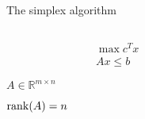 \pagestyle{empty}



\begin{frame}{The simplex algorithm}

  \begin{columns}
    \begin{column}{.5\textwidth}
      \begin{displaymath}
        \begin{array}{c}
          \max c^T x\\
          A x ≤ b
        \end{array}
      \end{displaymath}


      $A ∈ℝ^{m × n}$

      \medskip

      $\operatorname{\mathrm{rank}}(A) = n$ 
    \end{column}
    \begin{column}{.5\textwidth}
      
    \end{column}       
  \end{columns}
\end{frame}



